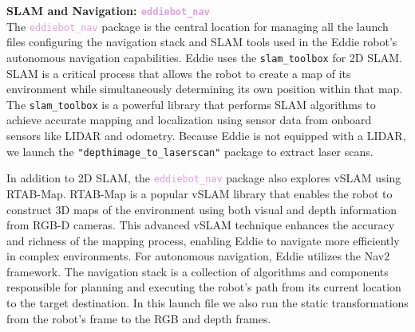 \textbf{SLAM and Navigation: \textcolor{Plum}{\texttt{\Large eddiebot\_nav}}}\\
The \textcolor{Plum}{\texttt{eddiebot\_nav}} package is the central location for managing all the launch files configuring the navigation stack and SLAM tools used in the Eddie robot's autonomous navigation capabilities.
Eddie uses the \texttt{slam\_toolbox} for 2D SLAM. SLAM is a critical process that allows the robot to create a map of its environment while simultaneously determining its own position within that map. The \texttt{slam\_toolbox} is a powerful library that performs SLAM algorithms to achieve accurate mapping and localization using sensor data from onboard sensors like LIDAR and odometry. Because Eddie is not equipped with a LIDAR, we launch the \texttt{"depthimage\_to\_laserscan"} package to extract laser scans.

In addition to 2D SLAM, the \textcolor{Plum}{\texttt{eddiebot\_nav}} package also explores vSLAM using RTAB-Map. RTAB-Map is a popular vSLAM library that enables the robot to construct 3D maps of the environment using both visual and depth information from RGB-D cameras. This advanced vSLAM technique enhances the accuracy and richness of the mapping process, enabling Eddie to navigate more efficiently in complex environments.
For autonomous navigation, Eddie utilizes the Nav2 framework. The navigation stack is a collection of algorithms and components responsible for planning and executing the robot's path from its current location to the target destination.
In this launch file we also run the static transformations from the robot's frame to the RGB and depth frames.

